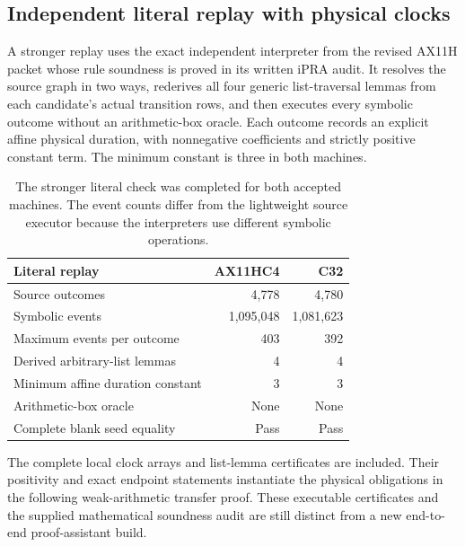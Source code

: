 \subsection{Independent literal replay with physical clocks}

A stronger replay uses the exact independent interpreter from the revised AX11H packet whose rule soundness is proved in its written iPRA audit. It resolves the source graph in two ways, rederives all four generic list-traversal lemmas from each candidate's actual transition rows, and then executes every symbolic outcome without an arithmetic-box oracle. Each outcome records an explicit affine physical duration, with nonnegative coefficients and strictly positive constant term. The minimum constant is three in both machines.

\begin{table}[ht]
\centering\small
\begin{tabular}{lrr}
\toprule
Literal replay&AX11HC4&C32\\
\midrule
Source outcomes&4,778&4,780\\
Symbolic events&1,095,048&1,081,623\\
Maximum events per outcome&403&392\\
Derived arbitrary-list lemmas&4&4\\
Minimum affine duration constant&3&3\\
Arithmetic-box oracle&None&None\\
Complete blank seed equality&Pass&Pass\\
\bottomrule
\end{tabular}
\caption{The stronger literal check was completed for both accepted machines. The event counts differ from the lightweight source executor because the interpreters use different symbolic operations.}
\end{table}

The complete local clock arrays and list-lemma certificates are included. Their positivity and exact endpoint statements instantiate the physical obligations in the following weak-arithmetic transfer proof. These executable certificates and the supplied mathematical soundness audit are still distinct from a new end-to-end proof-assistant build.
